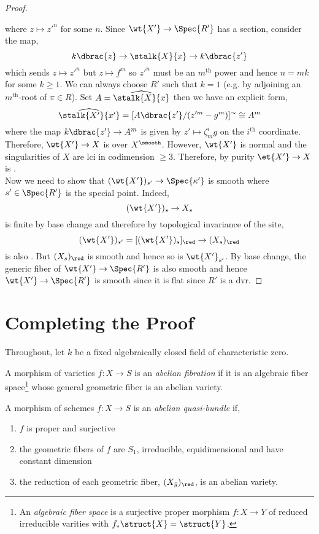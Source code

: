 \documentclass[12pt]{article}
\begin{document}
\begin{proof}
\begin{center}
\end{center}
where $z \mapsto z'^n$ for some $n$. Since $\wt{X'} \to \Spec{R'}$ has a section, consider the map,
\[ k\dbrac{z} \to \stalk{X}{x} \to k\dbrac{z'} \]
which sends $z \mapsto z'^n$ but $z \mapsto f^m$ so $z'^n$ must be an $m^{\text{th}}$ power and hence $n = mk$ for some $k \ge 1$. We can always choose $R'$ such that $k = 1$ (e.g. by adjoining an $m^{\text{th}}$-root of $\pi \in R$). Set $A = \widehat{\stalk{X}{x}}$ then we have an explicit form,
\[ \widehat{\stalk{X'}{x'}} = [A \dbrac{z'}/(z'^{m} - g^m)]^{\sim} \cong A^m \]
where the map $k\dbrac{z'} \to A^m$ is given by $z' \mapsto \zeta_m^i g$ on the $i^{\text{th}}$ coordinate. Therefore, $\wt{X'} \to X$ is \etale over $X^{\smooth}$. However, $\wt{X'}$ is normal and the singularities of $X$ are lci in codimension $\ge 3$. Therefore, by purity $\et{X'} \to X$ is \etale. 
\bigskip\\
Now we need to show that $(\wt{X'})_{s'} \to \Spec{\kappa'}$ is smooth where $s' \in \Spec{R'}$ is the special point. Indeed,
\[ (\wt{X'})_{s} \to X_s \]
is finite \etale by base change and therefore by topological invariance of the \etale site,
\[ (\wt{X'})_{s'} = [(\wt{X'})_{s}]_{\red} \to (X_s)_{\red} \]
is also \etale. But $(X_s)_{\red}$ is smooth and hence so is $\wt{X'}_{s'}$. By base change, the generic fiber of $\wt{X'} \to \Spec{R'}$ is also smooth and hence $\wt{X'} \to \Spec{R'}$ is smooth since it is flat since $R'$ is a dvr.
\end{proof}

\section{Completing the Proof}

Throughout, let $k$ be a fixed algebraically closed field of characteristic zero.

\begin{defn}
A morphism of varieties $f : X \to S$ is an \textit{abelian fibration} if it is an algebraic fiber space\footnote{An \textit{algebraic fiber space} is a surjective proper morphism $f : X \to Y$ of reduced irreducible varities with $f_* \struct{X} = \struct{Y}$.} whose general geometric fiber is an abelian variety. 
\end{defn}

\begin{defn}
A morphism of schemes $f : X \to S$ is an \textit{abelian quasi-bundle} if,
\begin{enumerate}
\item $f$ is proper and surjective
\item the geometric fibers of $f$ are $S_1$, irreducible, equidimensional and have constant dimension
\item the reduction of each geometric fiber, $(X_{\bar{y}})_{\red}$, is an abelian variety. 
\end{enumerate} 
\end{defn}
\end{document}
